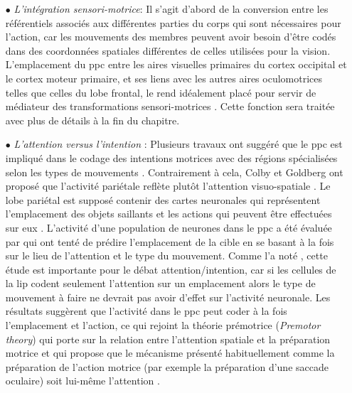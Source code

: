 \begin{itemize}
\item[$\bullet$] \textit{L'intégration sensori-motrice}:
Il s'agit d'abord de la conversion entre les référentiels associés aux différentes parties du corps qui sont nécessaires pour l'action, car les mouvements des membres peuvent avoir besoin d'être codés dans des coordonnées spatiales différentes de celles utilisées pour la vision. L'emplacement du \gls{ppc} entre les aires visuelles primaires du cortex occipital et le cortex moteur primaire, et ses liens avec les autres aires oculomotrices telles que celles du lobe frontal, le rend idéalement placé pour servir de médiateur des transformations sensori-motrices \cite {Rizzolatti:1997, Machado:2004}. Cette fonction sera traitée avec plus de détails à la fin du chapitre.\\
\item[$\bullet$] \textit{L'attention versus l'intention }:
Plusieurs travaux ont suggéré que le \gls{ppc} est impliqué dans le codage des intentions motrices avec des régions spécialisées selon les types de mouvements \cite{Andersen:2002, Mountcastle:1975}. Contrairement à cela, Colby et Goldberg \cite{Colby:1999} ont proposé que l'activité pariétale reflète plutôt l'attention visuo-spatiale \cite{Bisley:2003}. Le lobe pariétal est supposé contenir des cartes neuronales qui représentent l'emplacement des objets saillants et les actions qui peuvent être effectuées sur eux \cite{Colby:1996}.
L'activité d'une population de neurones dans le \gls{ppc} a été évaluée par \cite{Quiroga:2006} qui ont tenté de prédire l'emplacement de la cible en se basant à la fois sur le lieu de l'attention et le type du mouvement. Comme l'a noté \cite{List:2006}, cette étude est importante pour le débat attention/intention, car si les cellules de la \gls{lip} codent seulement l'attention sur un emplacement alors le type de mouvement à faire ne devrait pas avoir d'effet sur l'activité neuronale. Les résultats suggèrent que l'activité dans le \gls{ppc} peut coder à la fois l'emplacement et l'action, ce qui rejoint la théorie prémotrice (\textit{Premotor theory}) qui porte sur la relation entre l'attention spatiale et la préparation motrice et qui propose que le mécanisme présenté habituellement comme la préparation de l'action motrice (par exemple la préparation d'une saccade oculaire) soit lui-même l'attention \cite{Rizzolatti:1994}.\\


   


\end{itemize}


